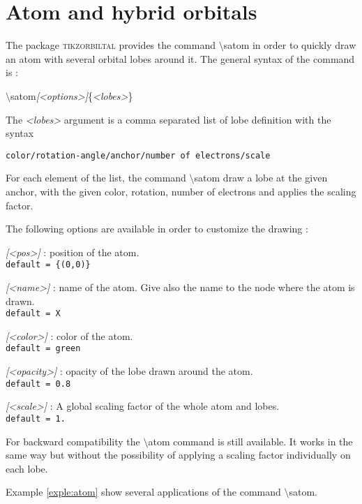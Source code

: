 \documentclass[10pt]{article}
\newcommand*{\cmd}[1]{{\ttfamily\color{blue!50!black}$\setminus$#1}\xspace}
\newcommand*{\opt}[1]{{\ttfamily\itshape\color{green!60!black}[<#1>]}\xspace}
\newcommand*{\marg}[1]{{\ttfamily\itshape\color{red!95!black}<#1>}\xspace}
\newcommand{\package}{\textsc{\sffamily\color{blue!50!black}tikzorbiltal}\xspace}
\begin{document}
\section{Atom and hybrid orbitals}

The package \package provides the command \cmd{satom} in order to quickly draw an atom with several orbital lobes around it. The general syntax of the command is :

\cmd{satom}\opt{options}\{\marg{lobes}\}

The \marg{lobes} argument is a comma separated list of lobe definition with the syntax 

\texttt{color/rotation-angle/anchor/number of electrons/scale}

For each element of the list, the command \cmd{satom} draw a lobe at the given
anchor, with the given color, rotation, number of electrons and applies the
scaling factor.

The following options are available in order to customize the drawing :

\begin{description}
    \item \opt{pos} : position of the atom.\\
    \texttt{default = \{(0,0)\}}
    
    \item \opt{name} : name of the atom. Give also the name to the node where the atom is drawn.\\
    \texttt{default = X}
    
    \item \opt{color} : color of the atom.\\
    \texttt{default = green}
    
    \item \opt{opacity} : opacity of the lobe drawn around the atom.\\
    \texttt{default = 0.8}
    
    \item \opt{scale} : A global scaling factor of the whole atom and lobes.\\
    \texttt{default = 1.}
\end{description}

For backward compatibility the \cmd{atom} command is still available. It works
in the same way but without the possibility of applying a scaling factor
individually on each lobe.

Example \ref{exple:atom} show several applications of the command \cmd{satom}.
\end{document}
